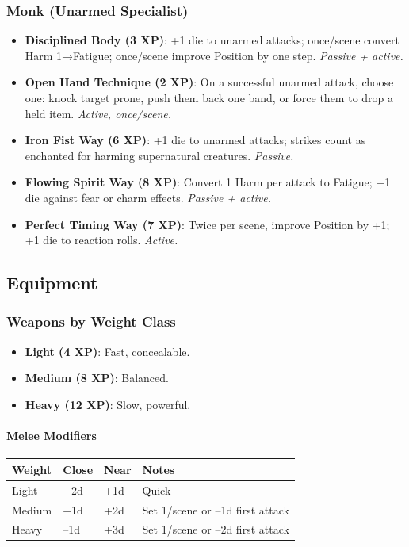 \subsubsection*{Monk (Unarmed Specialist)}
\begin{itemize}
  \item \textbf{Disciplined Body (3 XP)}: +1 die to unarmed attacks; once/scene convert Harm 1→Fatigue; once/scene improve Position by one step. \textit{Passive + active.}
  \item \textbf{Open Hand Technique (2 XP)}: On a successful unarmed attack, choose one: knock target prone, push them back one band, or force them to drop a held item. \textit{Active, once/scene.}
  \item \textbf{Iron Fist Way (6 XP)}: +1 die to unarmed attacks; strikes count as enchanted for harming supernatural creatures. \textit{Passive.}
  \item \textbf{Flowing Spirit Way (8 XP)}: Convert 1 Harm per attack to Fatigue; +1 die against fear or charm effects. \textit{Passive + active.}
  \item \textbf{Perfect Timing Way (7 XP)}: Twice per scene, improve Position by +1; +1 die to reaction rolls. \textit{Active.}
\end{itemize}

\subsection{Equipment}

\subsubsection{Weapons by Weight Class}
\begin{itemize}
  \item \textbf{Light (4 XP)}: Fast, concealable.
  \item \textbf{Medium (8 XP)}: Balanced.
  \item \textbf{Heavy (12 XP)}: Slow, powerful.
\end{itemize}

\paragraph{Melee Modifiers}
\begin{center}
\begin{tabular}{llll}
\toprule
Weight & Close & Near & Notes \\
\midrule
Light  & +2d & +1d & Quick \\
Medium & +1d & +2d & Set 1/scene or –1d first attack \\
Heavy  & –1d & +3d & Set 1/scene or –2d first attack \\
\bottomrule
\end{tabular}
\end{center}

